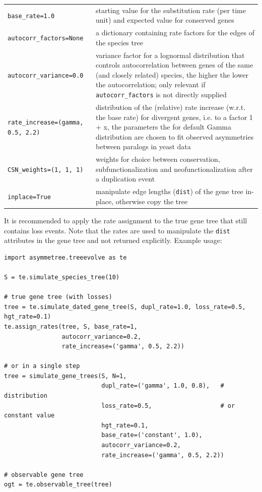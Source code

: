 \documentclass[hidelinks,11pt]{article}
\newcommand{\sq}{\textquotesingle}
\begin{document}
\vspace{3mm}
{\small\centering
\begin{longtable}{ p{4.0cm} p{9cm} }
	\texttt{base\_rate=1.0} & starting value for the substitution rate (per time unit) and expected value for conserved genes\\
	\texttt{autocorr\_factors=None}  & a dictionary containing rate factors for the edges of the species tree\\
	\texttt{autocorr\_variance=0.0}  & variance factor for a lognormal distribution that controls autocorrelation between genes of the same (and closely related) species, the higher the lower the auto\-corre\-la\-tion; only relevant if \texttt{autocorr\_factors} is not directly supplied\\
	\texttt{rate\_increase=\newline (\sq gamma\sq, 0.5, 2.2)}  & distribution of
	the (relative) rate increase (w.r.t. the
  base rate) for divergent genes, i.e. to a factor 1 + x, the parameters the
  for default Gamma distribution are chosen to fit observed asymmetries between
  paralogs in yeast data \citep{byrne2007}\\
	\texttt{CSN\_weights=(1, 1, 1)}  & weights for choice between conservation,
	subfunctionalization and neofunctionalization after a duplication event\\
	\texttt{inplace=True}  & manipulate edge lengths (\texttt{dist}) of the gene tree in-place, otherwise copy the tree\\
\end{longtable}
}
\vspace{3mm}

\noindent
It is recommended to apply the rate assignment to the true gene tree that still contains loss events.
Note that the rates are used to manipulate the \texttt{dist} attributes in the gene tree and not returned explicitly.
Example usage:
\begin{adjustwidth}{1cm}{1cm}\vspace{2mm}
\begin{verbatim}
import asymmetree.treeevolve as te

S = te.simulate_species_tree(10)

# true gene tree (with losses)
tree = te.simulate_dated_gene_tree(S, dupl_rate=1.0, loss_rate=0.5, hgt_rate=0.1)
te.assign_rates(tree, S, base_rate=1,
                autocorr_variance=0.2,
                rate_increase=('gamma', 0.5, 2.2))

# or in a single step
tree = simulate_gene_trees(S, N=1,
                           dupl_rate=('gamma', 1.0, 0.8),   # distribution
                           loss_rate=0.5,                   # or constant value
                           hgt_rate=0.1,
                           base_rate=('constant', 1.0),
                           autocorr_variance=0.2,
                           rate_increase=('gamma', 0.5, 2.2))

# observable gene tree
ogt = te.observable_tree(tree)
\end{verbatim}
\end{adjustwidth}
\end{document}
